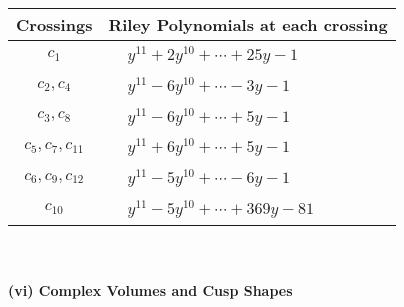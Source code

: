 \documentclass[1p]{elsarticle_modified}
\theoremstyle{definition}
\begin{document}
\begin{tabular}{m{50pt}|m{274pt}}
Crossings & \hspace{64pt}Riley Polynomials at each crossing \\
\hline $$\begin{aligned}c_{1}\end{aligned}$$&$\begin{aligned}
&y^{11}+2 y^{10}+\cdots+25 y-1
\end{aligned}$\\
\hline $$\begin{aligned}c_{2},c_{4}\end{aligned}$$&$\begin{aligned}
&y^{11}-6 y^{10}+\cdots-3 y-1
\end{aligned}$\\
\hline $$\begin{aligned}c_{3},c_{8}\end{aligned}$$&$\begin{aligned}
&y^{11}-6 y^{10}+\cdots+5 y-1
\end{aligned}$\\
\hline $$\begin{aligned}c_{5},c_{7},c_{11}\end{aligned}$$&$\begin{aligned}
&y^{11}+6 y^{10}+\cdots+5 y-1
\end{aligned}$\\
\hline $$\begin{aligned}c_{6},c_{9},c_{12}\end{aligned}$$&$\begin{aligned}
&y^{11}-5 y^{10}+\cdots-6 y-1
\end{aligned}$\\
\hline $$\begin{aligned}c_{10}\end{aligned}$$&$\begin{aligned}
&y^{11}-5 y^{10}+\cdots+369 y-81
\end{aligned}$\\
\hline
\end{tabular}\\~\\
\newpage\flushleft \textbf{(vi) Complex Volumes and Cusp Shapes}
\end{document}
